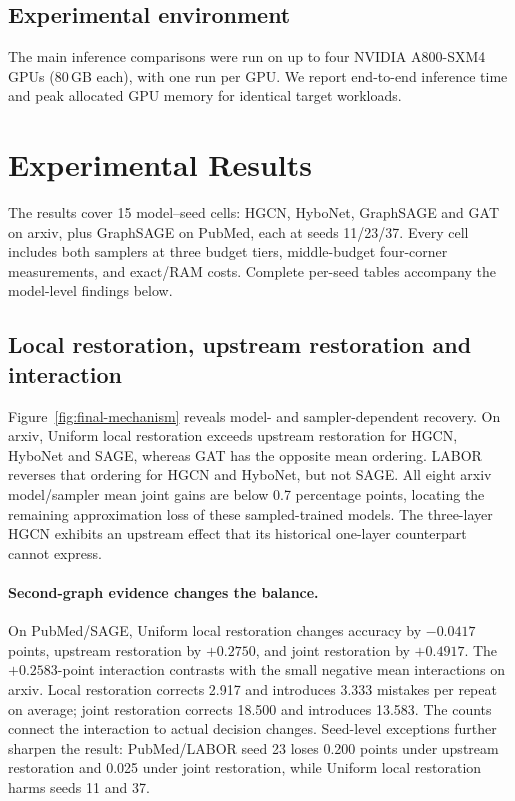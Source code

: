 \documentclass[sigconf, nonacm]{acmart}
\begin{document}
\subsection{Experimental environment}
The main inference comparisons were run on up to four NVIDIA A800-SXM4 GPUs (80\,GB each), with one run per GPU. We report end-to-end inference time and peak allocated GPU memory for identical target workloads.



\section{Experimental Results}
\label{sec:results}
The results cover 15 model--seed cells: HGCN, HyboNet, GraphSAGE and GAT on arxiv, plus GraphSAGE on PubMed, each at seeds 11/23/37. Every cell includes both samplers at three budget tiers, middle-budget four-corner measurements, and exact/RAM costs. Complete per-seed tables accompany the model-level findings below.

\subsection{Local restoration, upstream restoration and interaction}
Figure~\ref{fig:final-mechanism} reveals model- and sampler-dependent recovery. On arxiv, Uniform local restoration exceeds upstream restoration for HGCN, HyboNet and SAGE, whereas GAT has the opposite mean ordering. LABOR reverses that ordering for HGCN and HyboNet, but not SAGE. All eight arxiv model/sampler mean joint gains are below 0.7 percentage points, locating the remaining approximation loss of these sampled-trained models. The three-layer HGCN exhibits an upstream effect that its historical one-layer counterpart cannot express.

\FinalMechanismFigure

\paragraph{Second-graph evidence changes the balance.}
On PubMed/SAGE, Uniform local restoration changes accuracy by $-0.0417$ points, upstream restoration by $+0.2750$, and joint restoration by $+0.4917$. The $+0.2583$-point interaction contrasts with the small negative mean interactions on arxiv. Local restoration corrects 2.917 and introduces 3.333 mistakes per repeat on average; joint restoration corrects 18.500 and introduces 13.583. The counts connect the interaction to actual decision changes. Seed-level exceptions further sharpen the result: PubMed/LABOR seed 23 loses 0.200 points under upstream restoration and 0.025 under joint restoration, while Uniform local restoration harms seeds 11 and 37.
\end{document}

